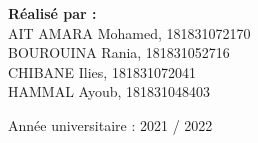 \documentclass[12pt]{report}
\begin{document}
\begin{titlepage}
\begin{center}
            \large
            \textbf{Réalisé par :}\\
            AIT AMARA Mohamed, 181831072170\\
            BOUROUINA Rania, 181831052716\\
            CHIBANE Ilies, 181831072041\\
            HAMMAL Ayoub, 181831048403
            
            \vfill
            Année universitaire : 2021 / 2022
        \end{center}
    \end{titlepage}
    \normalsize

    \tableofcontents

    \newpage
    \onehalfspacing
    

    \newpage
    \onehalfspacing
    

    \newpage
    \onehalfspacing
    

    \newpage
    \onehalfspacing
    

    \newpage
    \onehalfspacing
    

    \newpage
    \singlespacing
    
\end{document}
